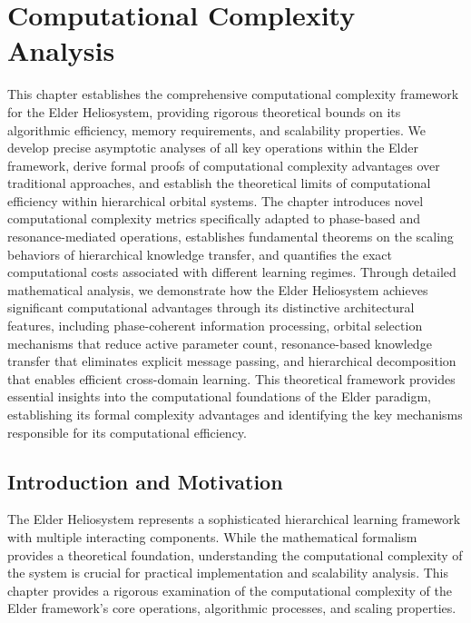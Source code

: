 \chapter{Computational Complexity Analysis}

\begin{tcolorbox}[colback=blue!5!white,colframe=blue!75!black,title=Chapter Summary]
This chapter establishes the comprehensive computational complexity framework for the Elder Heliosystem, providing rigorous theoretical bounds on its algorithmic efficiency, memory requirements, and scalability properties. We develop precise asymptotic analyses of all key operations within the Elder framework, derive formal proofs of computational complexity advantages over traditional approaches, and establish the theoretical limits of computational efficiency within hierarchical orbital systems. The chapter introduces novel computational complexity metrics specifically adapted to phase-based and resonance-mediated operations, establishes fundamental theorems on the scaling behaviors of hierarchical knowledge transfer, and quantifies the exact computational costs associated with different learning regimes. Through detailed mathematical analysis, we demonstrate how the Elder Heliosystem achieves significant computational advantages through its distinctive architectural features, including phase-coherent information processing, orbital selection mechanisms that reduce active parameter count, resonance-based knowledge transfer that eliminates explicit message passing, and hierarchical decomposition that enables efficient cross-domain learning. This theoretical framework provides essential insights into the computational foundations of the Elder paradigm, establishing its formal complexity advantages and identifying the key mechanisms responsible for its computational efficiency.
\end{tcolorbox}

\section{Introduction and Motivation}

The Elder Heliosystem represents a sophisticated hierarchical learning framework with multiple interacting components. While the mathematical formalism provides a theoretical foundation, understanding the computational complexity of the system is crucial for practical implementation and scalability analysis. This chapter provides a rigorous examination of the computational complexity of the Elder framework's core operations, algorithmic processes, and scaling properties.

